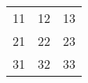 \documentclass{article}
\begin{document}
\begin{center}
\begin{tabular}{ c c c }
11 & 12 & 13 \\
21 & 22 & 23 \\
31 & 32 & 33
\end{tabular}
\end{center}
\end{document}
